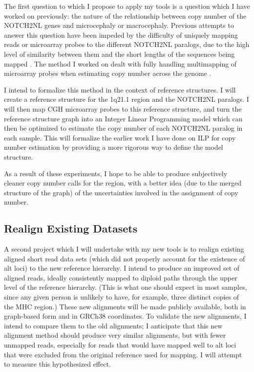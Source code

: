 \documentclass[11pt,proposal]{ucthesis}
\begin{document}
The first question to which I propose to apply my tools is a question which I have worked on previously: the nature of the relationship between copy number of the NOTCH2NL genes and microcephaly or macrocephaly. Previous attempts to answer this question have been impeded by the difficulty of uniquely mapping reads or microarray probes to the different NOTCH2NL paralogs, due to the high level of similarity between them and the short lengths of the sequences being mapped \cite{jacobs2014recently}. The method I worked on dealt with fully handling multimapping of microarray probes when estimating copy number across the genome \cite{jacobs2014recently}.

I intend to formalize this method in the context of reference structures. I will create a reference structure for the 1q21.1 region and the NOTCH2NL paralogs. I will then map CGH microarray probes to this reference structure, and turn the reference structure graph into an Integer Linear Programming model which can then be optimized to estimate the copy number of each NOTCH2NL paralog in each sample. This will formalize the earlier work I have done on ILP for copy number estimation by providing a more rigorous way to define the model structure.

As a result of these experiments, I hope to be able to produce subjectively cleaner copy number calls for the region, with a better idea (due to the merged structure of the graph) of the uncertainties involved in the assignment of copy number.

\subsection{Realign Existing Datasets}
\label{subsec:aim3realign}

A second project which I will undertake with my new tools is to realign existing aligned short read data sets (which did not properly account for the existence of alt loci) to the new reference hierarchy. I intend to produce an improved set of aligned reads, ideally consistently mapped to diploid paths through the upper level of the reference hierarchy. (This is what one should expect in most samples, since any given person is unlikely to have, for example, three distinct copies of the MHC region.) These new alignments will be made publicly available, both in graph-based form and in GRCh38 coordinates. To validate the new alignments, I intend to compare them to the old alignments; I anticipate that this new alignment method should produce very similar alignments, but with fewer unmapped reads, especially for reads that would have mapped well to alt loci that were excluded from the original reference used for mapping. I will attempt to measure this hypothesized effect.
\end{document}
